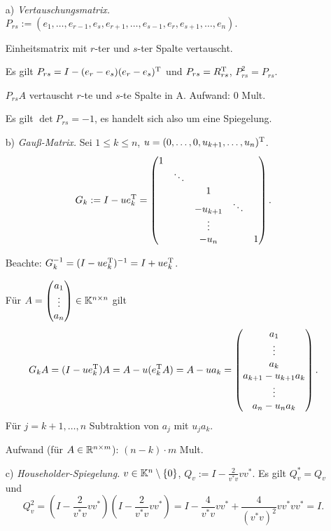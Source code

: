 \begin{Beispiele}[Elementarmatrizen]
\quad
\begin{itemize}
\item[a)] \emph{Vertauschungsmatrix.}
  $P_{rs} := (e_1,\ldots,e_{r-1},e_s,e_{r+1},\ldots,e_{s-1},e_r,e_{s+1},\ldots,e_n).$

  Einheitsmatrix mit $r$-ter und $s$-ter Spalte vertauscht.

  Es gilt $P_{rs} = I - (e_r - e_s)(e_r - e_s)^\mathrm T$ und $P_{rs} = R_{rs}^\mathrm T$,
  $P_{rs}^2 = P_{rs}$.
  
  $P_{rs} A$ vertauscht $r$-te und $s$-te Spalte in A. Aufwand: 0 Mult.
  
  Es gilt $\det P_{rs} = -1$, es handelt sich also um eine Spiegelung.

\item[b)] \emph{Gauß-Matrix.}
  Sei $1 \le k \le n$, $u = (0, \ldots, 0, u_{k+1}, \ldots, u_n)^\mathrm T$.
  \[
    G_k := I - ue_k^\mathrm T = \begin{pmatrix}
      1 & & & \\
      & \ddots & & & \\
      & & 1 & & \\
      & & -u_{k+1} & \ddots & \\
      & & \vdots & & \\
      & & -u_n & & 1 \\
    \end{pmatrix}.
  \]

  Beachte: $G^{-1}_k = (I - ue_k^\mathrm T)^{-1} = I + ue_k^\mathrm T$.

  Für $A = \begin{pmatrix} a_1 \\ \vdots \\ a_n \end{pmatrix} \in \mathbb K^{n\times n}$
  gilt \[
    G_k A = (I - ue_k^\mathrm T) A = A - u(e_k^\mathrm T A) = A - ua_k
          = \begin{pmatrix} a_1 \\ \vdots \\ a_k \\ a_{k+1} - u_{k+1} a_k \\ \vdots \\ a_n - u_n a_k \end{pmatrix}.
  \]
  Für $j = k+1, \ldots, n$ Subtraktion von $a_j$ mit $u_j a_k$.

  Aufwand (für $A \in \mathbb R^{n\times m}$): $(n-k) \cdot m$ Mult.

\item[c)] \emph{Householder-Spiegelung.}
  $v \in \mathbb K^n \setminus \{0\}$, $Q_v := I - \frac{2}{v^{*}v}vv^{*}.$
  Es gilt $Q_v^{*} = Q_v$ und \[
    Q_v^2 = (I - \frac{2}{v^{*}v}vv^{*})(I - \frac{2}{v^{*}v}vv^{*})
          = I - \frac{4}{v^*v}vv^* + \frac{4}{(v^*v)^2}vv^*vv^* = I.    
  \]


\end{itemize}
\end{Beispiele}
